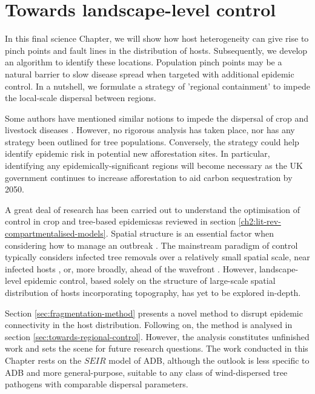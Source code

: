 
\chapter{Towards landscape-level control}

\label{ch7:landscape-level-control}

In this final science Chapter, we will show how host heterogeneity
can give rise to pinch points and fault lines in the distribution of hosts. Subsequently, we develop an algorithm to identify these locations. Population pinch points may be a natural barrier to slow disease spread when targeted with additional epidemic control. In a nutshell, we formulate a strategy of 'regional containment' to impede the local-scale dispersal between regions. 

Some authors have mentioned similar notions to impede the dispersal of crop and livestock diseases \cite{PAPAIX201435, GILIOLI20131, Gilligan-disease-management}. However, no rigorous analysis has taken place, nor has any strategy been outlined for tree populations. Conversely, the strategy could help identify epidemic risk in potential new afforestation sites. In particular, identifying any epidemically-significant regions will become necessary as the UK government continues to increase afforestation to aid carbon sequestration by 2050.

A great deal of research has been carried out to understand the optimisation of control in crop and tree-based epidemics\textemdash as reviewed in section \ref{ch2:lit-rev-compartmentalised-models}. 
Spatial structure is an essential factor when considering how to manage an outbreak \cite{spatial-control-optimisation, control-heterogeneous-landscapes}. 
The mainstream paradigm of control typically considers infected tree removals over a relatively small spatial scale, near infected hosts \cite{WEBIDEMICS}, or, more broadly, ahead of the wavefront \cite{large-scale-control}. 
However, landscape-level epidemic control, based solely on the structure of large-scale spatial distribution of hosts incorporating topography, has yet to be explored in-depth.

Section \ref{sec:fragmentation-method} presents a novel method to disrupt epidemic connectivity in the host distribution. Following on, the method is analysed in section \ref{sec:towards-regional-control}. However, the analysis constitutes unfinished work and sets the scene for future research questions. The work conducted in this Chapter rests on the $SEIR$ model of ADB, although the outlook is less specific to ADB and more general-purpose, suitable to any class of wind-dispersed tree pathogens with comparable dispersal parameters. 

